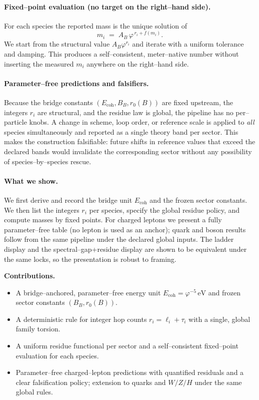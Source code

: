 \documentclass[epjc3]{svjour3}
\begin{document}
\paragraph{Fixed–point evaluation (no target on the right–hand side).}
For each species the reported mass is the unique solution of
\[
m_i \;=\; A_B\,\varphi^{\,r_i+f(m_i)}.
\]
We start from the structural value $A_B\varphi^{r_i}$ and iterate with a uniform tolerance and damping. This produces a self–consistent, meter–native number without inserting the measured $m_i$ anywhere on the right–hand side.

\paragraph{Parameter–free predictions and falsifiers.}
Because the bridge constants $(E_{\mathrm{coh}},B_B,r_0(B))$ are fixed upstream, the integers $r_i$ are structural, and the residue law is global, the pipeline has no per–particle knobs. A change in scheme, loop order, or reference scale is applied to \emph{all} species simultaneously and reported as a single theory band per sector. This makes the construction falsifiable: future shifts in reference values that exceed the declared bands would invalidate the corresponding sector without any possibility of species–by–species rescue.

\paragraph{What we show.}
We first derive and record the bridge unit $E_{\mathrm{coh}}$ and the frozen sector constants. We then list the integers $r_i$ per species, specify the global residue policy, and compute masses by fixed points. For charged leptons we present a fully parameter–free table (no lepton is used as an anchor); quark and boson results follow from the same pipeline under the declared global inputs. The ladder display and the spectral–gap+residue display are shown to be equivalent under the same locks, so the presentation is robust to framing.

\medskip
\noindent\textbf{Contributions.}
\begin{itemize}
  \item A bridge–anchored, parameter–free energy unit $E_{\mathrm{coh}}=\varphi^{-5}\,\mathrm{eV}$ and frozen sector constants $(B_B,r_0(B))$.
  \item A deterministic rule for integer hop counts $r_i=\ell_i+\tau_i$ with a single, global family torsion.
  \item A uniform residue functional per sector and a self–consistent fixed–point evaluation for each species.
  \item Parameter–free charged–lepton predictions with quantified residuals and a clear falsification policy; extension to quarks and $W/Z/H$ under the same global rules.
\end{itemize}
\end{document}
